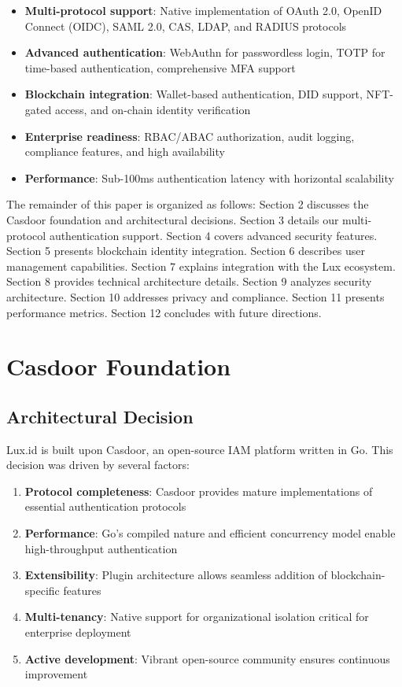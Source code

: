 \documentclass[11pt,a4paper]{article}
\begin{document}
\begin{itemize}
    \item \textbf{Multi-protocol support}: Native implementation of OAuth 2.0, OpenID Connect (OIDC), SAML 2.0, CAS, LDAP, and RADIUS protocols
    \item \textbf{Advanced authentication}: WebAuthn for passwordless login, TOTP for time-based authentication, comprehensive MFA support
    \item \textbf{Blockchain integration}: Wallet-based authentication, DID support, NFT-gated access, and on-chain identity verification
    \item \textbf{Enterprise readiness}: RBAC/ABAC authorization, audit logging, compliance features, and high availability
    \item \textbf{Performance}: Sub-100ms authentication latency with horizontal scalability
\end{itemize}

The remainder of this paper is organized as follows: Section 2 discusses the Casdoor foundation and architectural decisions. Section 3 details our multi-protocol authentication support. Section 4 covers advanced security features. Section 5 presents blockchain identity integration. Section 6 describes user management capabilities. Section 7 explains integration with the Lux ecosystem. Section 8 provides technical architecture details. Section 9 analyzes security architecture. Section 10 addresses privacy and compliance. Section 11 presents performance metrics. Section 12 concludes with future directions.

\section{Casdoor Foundation}

\subsection{Architectural Decision}

Lux.id is built upon Casdoor, an open-source IAM platform written in Go. This decision was driven by several factors:

\begin{enumerate}
    \item \textbf{Protocol completeness}: Casdoor provides mature implementations of essential authentication protocols
    \item \textbf{Performance}: Go's compiled nature and efficient concurrency model enable high-throughput authentication
    \item \textbf{Extensibility}: Plugin architecture allows seamless addition of blockchain-specific features
    \item \textbf{Multi-tenancy}: Native support for organizational isolation critical for enterprise deployment
    \item \textbf{Active development}: Vibrant open-source community ensures continuous improvement
\end{enumerate}
\end{document}
